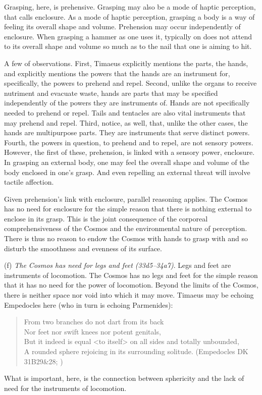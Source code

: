 Grasping, here, is prehensive. Grasping may also be a mode of haptic perception, that \citet{Lederman:1987fr} calls enclosure. As a mode of haptic perception, grasping a body is a way of feeling its overall shape and volume. Prehension may occur independently of enclosure. When grasping a hammer as one uses it, typically on does not attend to its overall shape and volume so much as to the nail that one is aiming to hit. 

A few of observations. First, Timaeus explicitly mentions the parts, the hands, and explicitly mentions the powers that the hands are an instrument for, specifically, the powers to prehend and repel. Second, unlike the organs to receive nutriment and evacuate waste, hands are parts that may be specified independently of the powers they are instruments of. Hands are not specifically needed to prehend or repel. Tails and tentacles are also vital instruments that may prehend and repel. Third, notice, as well, that, unlike the other cases, the hands are multipurpose parts. They are instruments that serve distinct powers. Fourth, the powers in question, to prehend and to repel, are not sensory powers. However, the first of these, prehension, is linked with a sensory power, enclosure. In grasping an external body, one may feel the overall shape and volume of the body enclosed in one's grasp. And even repelling an external threat will involve tactile affection. 

Given prehension's link with enclosure, parallel reasoning applies. The Cosmos has no need for enclosure for the simple reason that there is nothing external to enclose in its grasp. This is the joint consequence of the corporeal comprehensiveness of the Cosmos and the environmental nature of perception. There is thus no reason to endow the Cosmos with hands to grasp with and so disturb the smoothness and evenness of its surface.

(f) \emph{The Cosmos has need for legs and feet (33d5–34a7)}. Legs and feet are instruments of locomotion. The Cosmos has no legs and feet for the simple reason that it has no need for the power of locomotion. Beyond the limits of the Cosmos, there is neither space nor void into which it may move. Timaeus may be echoing Empedocles here (who in turn is echoing Parmenides):
\begin{verse}
	From two branches do not dart from its back\\
	Nor feet nor swift knees nor potent genitals,\\
	But it indeed is equal <to itself> on all sides and totally unbounded,\\
	A rounded sphere rejoicing in its surrounding solitude. (Empedocles DK 31B29\&28; \citealt[233]{Inwood:2001ve})
\end{verse}
What is important, here, is the connection between sphericity and the lack of need for the instruments of locomotion.

